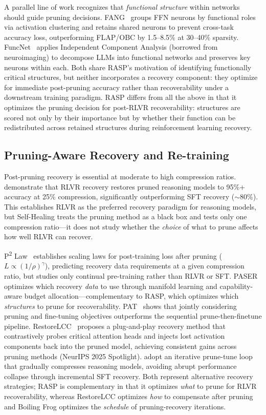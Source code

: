 A parallel line of work recognizes that \emph{functional structure} within networks should guide pruning decisions.
FANG~\citep{fang_2025} groups FFN neurons by functional roles via activation clustering and retains shared neurons to prevent cross-task accuracy loss, outperforming FLAP/OBC by 1.5--8.5\% at 30--40\% sparsity.
FuncNet~\citep{funcnet_2025} applies Independent Component Analysis (borrowed from neuroimaging) to decompose LLMs into functional networks and preserves key neurons within each.
Both share RASP's motivation of identifying functionally critical structures, but neither incorporates a recovery component: they optimize for immediate post-pruning accuracy rather than recoverability under a downstream training paradigm.
RASP differs from all the above in that it optimizes the pruning decision for post-RLVR recoverability: structures are scored not only by their importance but by whether their function can be redistributed across retained structures during reinforcement learning recovery.

\subsection{Pruning-Aware Recovery and Re-training}
\label{sec:rw_recovery}

Post-pruning recovery is essential at moderate to high compression ratios.
\citet{selfhealing2025} demonstrate that RLVR recovery restores pruned reasoning models to 95\%+ accuracy at 25\% compression, significantly outperforming SFT recovery (${\sim}$80\%).
This establishes RLVR as the preferred recovery paradigm for reasoning models, but Self-Healing treats the pruning method as a black box and tests only one compression ratio---it does not study whether the \emph{choice} of what to prune affects how well RLVR can recover.

P\textsuperscript{2} Law~\citep{p2law2025} establishes scaling laws for post-training loss after pruning ($L \propto (1/\rho)^\gamma$), predicting recovery data requirements at a given compression ratio, but studies only continual pre-training rather than RLVR or SFT.
PASER~\citep{paser2025} optimizes which recovery \emph{data} to use through manifold learning and capability-aware budget allocation---complementary to RASP, which optimizes which \emph{structures} to prune for recoverability.
PAT~\citep{pat2025} shows that jointly considering pruning and fine-tuning objectives outperforms the sequential prune-then-finetune pipeline.
RestoreLCC~\citep{restorelcc_2025} proposes a plug-and-play recovery method that contrastively probes critical attention heads and injects lost activation components back into the pruned model, achieving consistent gains across pruning methods (NeurIPS 2025 Spotlight).
\citet{boiling_frog_2026} adopt an iterative prune-tune loop that gradually compresses reasoning models, avoiding abrupt performance collapse through incremental SFT recovery.
Both represent alternative recovery strategies; RASP is complementary in that it optimizes \emph{what} to prune for RLVR recoverability, whereas RestoreLCC optimizes \emph{how} to compensate after pruning and Boiling Frog optimizes the \emph{schedule} of pruning-recovery iterations.

